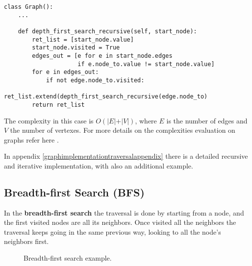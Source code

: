 \begin{lstlisting}[firstnumber=1, caption={Recursive implementation of a depth-first search.}]
class Graph():
	...
	
	def depth_first_search_recursive(self, start_node):
		ret_list = [start_node.value]
		start_node.visited = True
		edges_out = [e for e in start_node.edges
					 if e.node_to.value != start_node.value]
		for e in edges_out:
			if not edge.node_to.visited:
				ret_list.extend(depth_first_search_recursive(edge.node_to)
		return ret_list
\end{lstlisting}

The complexity in this case is \(O(\vert E \vert + \vert V \vert)\), where \(E\) is the number of edges and \(V\) the number of vertexes. For more details on the complexities evaluation on graphs refer here \cite{goodrich2013data}.

In appendix \ref{graphimplementationtraversalappendix} there is a detailed recursive and iterative implementation, with also an additional example.
\subsection{Breadth-first Search (BFS)}
In the \textbf{breadth-first search} the traversal is done by starting from a node, and the first visited nodes are all its neighbors. Once visited all the neighbors the traversal keeps going in the same previous way, looking to all the node's neighbors first.

\begin{figure}[H]
\centering
{}  
\caption[Breadth-first search example.]{Breadth-first search example.}
\label{graphs_7}
\end{figure}

